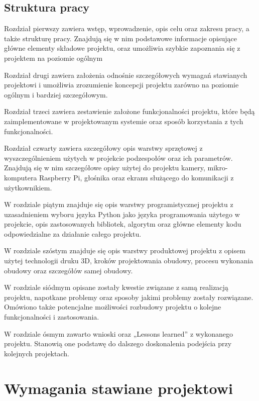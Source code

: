 \documentclass[a4paper,12pt,reqno]{article}
\begin{document}
\subsection{Struktura pracy} %

Rozdział pierwszy zawiera wstęp, wprowadzenie, opis celu oraz zakresu pracy, a także strukturę pracy. Znajdują się w nim podstawowe informacje opisujące główne elementy składowe projektu, oraz umożliwia szybkie zapoznania się z projektem na poziomie ogólnym

Rozdział drugi zawiera założenia odnośnie szczegółowych wymagań stawianych projektowi i umożliwia zrozumienie koncepcji projektu zarówno na poziomie ogólnym i bardziej szczegółowym.

Rozdział trzeci zawiera zestawienie założone funkcjonalności projektu, które będą zaimplementowane w projektowanym systemie oraz sposób korzystania z tych funkcjonalności.

Rozdział czwarty zawiera szczegółowy opis warstwy sprzętowej z wyszczególnieniem użytych w projekcie podzespołów oraz ich parametrów. Znajdują się w nim szczegółowe opisy użytej do projektu kamery, mikro-komputera Raspberry Pi, głośnika oraz ekranu służącego do komunikacji z użytkownikiem.

W rozdziale piątym znajduje się opis warstwy programistycznej projektu z uzasadnieniem wyboru języka Python jako języka programowania użytego w projekcie, opis zastosowanych bibliotek, algorytm oraz główne elementy kodu odpowiedzialne za działanie całego projektu.

W rozdziale szóstym znajduje się opis warstwy produktowej projektu z opisem użytej technologii druku 3D, kroków projektowania obudowy, procesu wykonania obudowy oraz szczegółów samej obudowy.

W rozdziale siódmym opisane zostały kwestie związane z samą realizacją projektu, napotkane problemy oraz sposoby jakimi problemy zostały rozwiązane. Omówiono także potencjalne możliwości rozbudowy projektu o kolejne funkcjonalności i zastosowania.

W rozdziale ósmym zawarto wnioski oraz „Lessons learned” z wykonanego projektu. Stanowią one podstawę do dalszego doskonalenia podejścia przy kolejnych projektach.

\newpage
\section{Wymagania stawiane projektowi} \label{section:wymagania}
\end{document}
